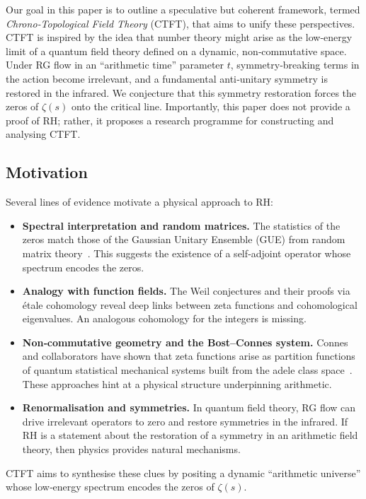 \documentclass[11pt, a4paper]{article}
\theoremstyle{definition}
\begin{document}
Our goal in this paper is to outline a speculative but coherent framework, termed \emph{Chrono‑Topological Field Theory} (CTFT), that aims to unify these perspectives.  CTFT is inspired by the idea that number theory might arise as the low‑energy limit of a quantum field theory defined on a dynamic, non‑commutative space.  Under RG flow in an “arithmetic time” parameter $t$, symmetry‑breaking terms in the action become irrelevant, and a fundamental anti‑unitary symmetry is restored in the infrared.  We conjecture that this symmetry restoration forces the zeros of $\zeta(s)$ onto the critical line.  Importantly, this paper does not provide a proof of RH; rather, it proposes a research programme for constructing and analysing CTFT.

\subsection{Motivation}
Several lines of evidence motivate a physical approach to RH:

\begin{itemize}
    \item \textbf{Spectral interpretation and random matrices.}  The statistics of the zeros match those of the Gaussian Unitary Ensemble (GUE) from random matrix theory \cite{Montgomery1973,Berry1999}.  This suggests the existence of a self‑adjoint operator whose spectrum encodes the zeros.
    \item \textbf{Analogy with function fields.}  The Weil conjectures and their proofs via étale cohomology reveal deep links between zeta functions and cohomological eigenvalues.  An analogous cohomology for the integers is missing.
    \item \textbf{Non‑commutative geometry and the Bost–Connes system.}  Connes and collaborators have shown that zeta functions arise as partition functions of quantum statistical mechanical systems built from the adele class space \cite{Bost1995,Connes1999}.  These approaches hint at a physical structure underpinning arithmetic.
    \item \textbf{Renormalisation and symmetries.}  In quantum field theory, RG flow can drive irrelevant operators to zero and restore symmetries in the infrared.  If RH is a statement about the restoration of a symmetry in an arithmetic field theory, then physics provides natural mechanisms.
\end{itemize}

CTFT aims to synthesise these clues by positing a dynamic “arithmetic universe” whose low‑energy spectrum encodes the zeros of $\zeta(s)$.
\end{document}
